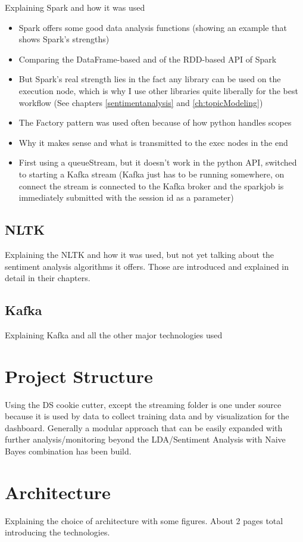 Explaining Spark and how it was used
\begin{itemize}
    \item
    Spark offers some good data analysis functions (showing an example that shows Spark's strengths) %
    \item
    Comparing the DataFrame-based and of the RDD-based API of Spark
    \item
    But Spark's real strength lies in the fact any library can be used on the execution node, which is why I use other libraries quite liberally for the best workflow (See chapters \ref{sentimentanalysis} and \ref{ch:topicModeling})
    \item
    The Factory pattern was used often because of how python handles scopes
    \item
    Why it makes sense and what is transmitted to the exec nodes in the end
    \item
    First using a queueStream, but it doesn’t work in the python API, switched to starting a Kafka stream (Kafka just has to be running somewhere, on connect the stream is connected to the Kafka broker and the sparkjob is immediately submitted with the session id as a parameter)
\end{itemize}

\subsection{NLTK}
\label{subsec:nltk}

Explaining the NLTK and how it was used, but not yet talking about the sentiment analysis algorithms it offers.
Those are introduced and explained in detail in their chapters.

\subsection{Kafka}
\label{subsec:kafka}

Explaining Kafka and all the other major technologies used

\section{Project Structure}
\label{sec:projectStructure}


Using the DS cookie cutter, except the streaming folder is one under source because it is used by data to collect training data and by visualization for the dashboard.
Generally a modular approach that can be easily expanded with further analysis/monitoring beyond the LDA/Sentiment Analysis with Naive Bayes combination has been build.


\section{Architecture}
\label{sec:architecture}

Explaining the choice of architecture with some figures.
About 2 pages total introducing the technologies.

\pagebreak[2]